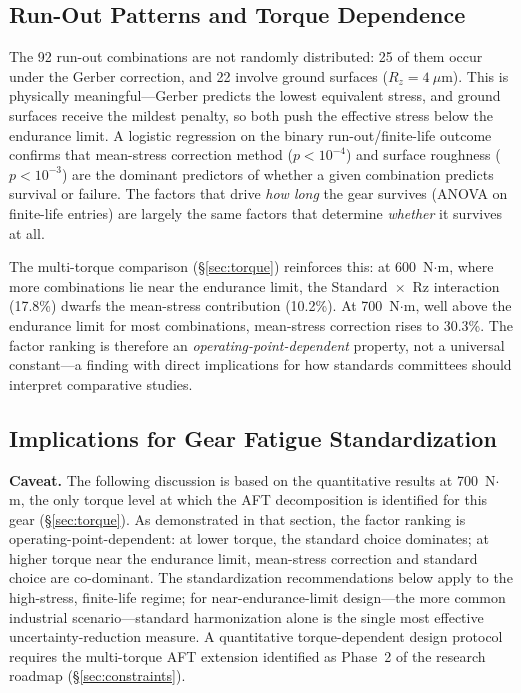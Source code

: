 \documentclass[12pt,a4paper]{article}
\begin{document}
\subsection{Run-Out Patterns and Torque Dependence}

The 92 run-out combinations are not randomly distributed: 25 of them
occur under the Gerber correction, and 22 involve ground surfaces
($R_z = 4~\mu$m). This is physically meaningful---Gerber predicts the
lowest equivalent stress, and ground surfaces receive the mildest
penalty, so both push the effective stress below the endurance limit.
A logistic regression on the binary run-out/finite-life outcome
confirms that mean-stress correction method ($p < 10^{-4}$) and
surface roughness ($p < 10^{-3}$) are the dominant predictors of
whether a given combination predicts survival or failure. The factors
that drive \emph{how long} the gear survives (ANOVA on finite-life
entries) are largely the same factors that determine \emph{whether} it
survives at all.

The multi-torque comparison (\S\ref{sec:torque}) reinforces this:
at 600~N$\cdot$m, where more combinations lie near the endurance
limit, the Standard~$\times$~Rz interaction (17.8\%) dwarfs the
mean-stress contribution (10.2\%). At 700~N$\cdot$m, well above the
endurance limit for most combinations, mean-stress correction rises to
30.3\%. The factor ranking is therefore an \emph{operating-point-dependent}
property, not a universal constant---a finding with direct implications
for how standards committees should interpret comparative studies.

\subsection{Implications for Gear Fatigue Standardization}

\textbf{Caveat.} The following discussion is based on the quantitative
results at 700~N$\cdot$m, the only torque level at which the AFT
decomposition is identified for this gear (\S\ref{sec:torque}). As
demonstrated in that section, the factor ranking is
operating-point-dependent: at lower torque, the standard choice
dominates; at higher torque near the endurance limit, mean-stress
correction and standard choice are co-dominant. The standardization
recommendations below apply to
the high-stress, finite-life regime; for near-endurance-limit
design---the more common industrial scenario---standard harmonization
alone is the single most effective uncertainty-reduction measure.
A quantitative torque-dependent design protocol requires the
multi-torque AFT extension identified as Phase~2 of the research
roadmap (\S\ref{sec:constraints}).
\end{document}
